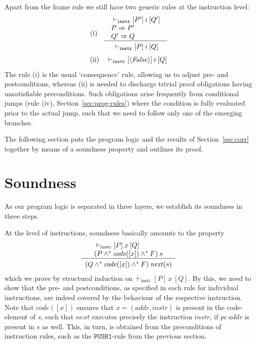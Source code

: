 \documentclass[sigplan,10pt,review]{acmart}\settopmatter{printfolios=true,printccs=false,printacmref=false}
\newcommand{\subpred}{\Rightarrow}
\newcommand{\sconj}{\wedge^*}
\newcommand{\ttrip}[5]{\mathit{#1} \vdash_{\mathrm{#2}}[#3]\:#4\:[#5]}
\newcommand{\xnext}{\mathit{next}}
\newcommand{\code}[1]{\mathit{code}(#1)}
\newcommand{\pc}{\mathit{pc}}
\newcommand{\instr}[1]{\mathtt{#1}}
\newcommand{\pure}[1]{\langle#1\rangle}
\newcommand{\RuleC}[2]{\begin{array}{c}#1\\\hline\noalign{\smallskip}#2\end{array}}
\begin{document}
Apart from the frame rule we still have two generic rules at the instruction level:
\[
\begin{array}{l l}
\mbox{(i)} & \RuleC{\begin{array}{l}
                     \ttrip{}{\mathtt{instr}}{P'}{i}{Q'} \\
                     P \subpred P' \\ 
                     Q' \subpred Q
                     \end{array}}{\ttrip{}{\mathtt{instr}}{P}{i}{Q}}
\end{array}
\]
\[
\begin{array}{l l}
\mbox{(ii)} & \ttrip{}{\mathtt{instr}}{\pure{\mathit{False}}}{i}{Q} 
\end{array}
\]
The rule (i) is the usual `consequence' rule, allowing us to adjust pre- and
postconditions, whereas (ii) is needed to discharge trivial 
proof obligations having unsatisfiable preconditions. Such obligations 
arise frequently from conditional jumps (rule (iv), Section~\ref{sec:prog-rules})
where the condition is fully evaluated prior to the actual jump, such that
we need to follow only one of the emerging branches.

The following section puts the program logic and the results of Section~\ref{sec:corr}
together by means of a soundness property and outlines its proof. 
%
\section{Soundness}
\label{sec:sound}
As our program logic is separated in three layers, we establish its soundness in three steps.

At the level of instructions, soundness basically amounts to the property
\begin{equation}
\label{prop:sound-instr}
\RuleC{\begin{array}{l}
         \ttrip{}{instr}{P}{x}{Q} \\
         (P \sconj \code{[x]} \sconj F)\: s
       \end{array}}
 {(Q \sconj \code{[x]} \sconj F)\: \xnext(s)}
\end{equation}
which we prove by structural induction on $\ttrip{}{instr}{P}{x}{Q}$. 
By this, we need to show that the pre- and postconditions, as specified in each 
rule for individual instructions, are indeed covered by the behaviour of 
the respective instruction. Note that $\code{[x]}$ ensures that 
$x = (\mathit{addr}, \mathit{instr})$ is present in the code-element of $s$, such that
$\xnext$ executes precisely the instruction $\mathit{instr}$, if $\pc\:\mathit{addr}$ is present in $s$ as well.
This, in turn, is obtained from the preconditions of instruction
rules, such as the $\instr{PUSH1}$-rule from the previous section.
\end{document}
